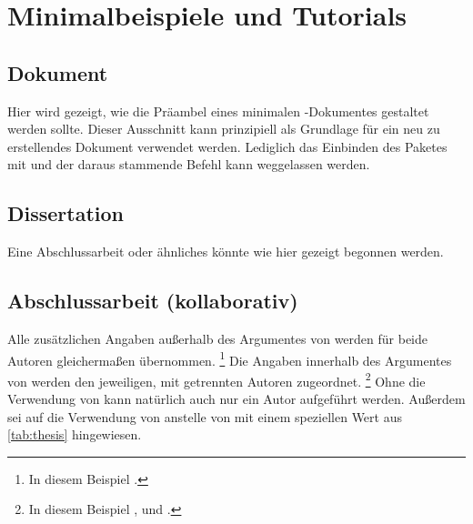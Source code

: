 \chapter{Minimalbeispiele und Tutorials}
\label{sec:exmpl}

\section{Dokument}
Hier wird gezeigt, wie die Präambel eines minimalen -Dokumentes 
gestaltet werden sollte. Dieser Ausschnitt kann prinzipiell als Grundlage für 
ein neu zu erstellendes Dokument verwendet werden. Lediglich das Einbinden des 
Paketes  mit  und 
der daraus stammende Befehl  kann weggelassen werden.

\section{Dissertation}
\label{sec:exmpl:dissertation}
Eine Abschlussarbeit oder ähnliches könnte wie hier gezeigt begonnen werden.

\section{Abschlussarbeit (kollaborativ)}
\label{sec:exmpl:thesis}
Alle zusätzlichen Angaben außerhalb des Argumentes von  werden 
für beide Autoren gleichermaßen übernommen.%
\footnote{In diesem Beispiel .}
Die Angaben innerhalb des Argumentes von  werden den jeweiligen, 
mit  getrennten Autoren zugeordnet.%
\footnote{%
  In diesem Beispiel ,  und 
  .
}
Ohne die Verwendung von  kann natürlich auch nur ein Autor 
aufgeführt werden. Außerdem sei auf die Verwendung von  anstelle 
von  mit einem speziellen Wert aus \autoref{tab:thesis} 
hingewiesen.

